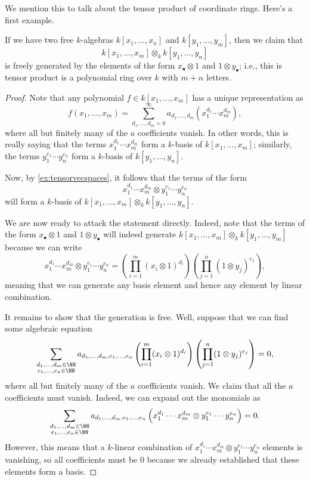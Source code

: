 We mention this to talk about the tensor product of coordinate rings. Here's a first example.
\begin{exe} \label{exe:basictensorcoordinate}
	If we have two free $k$-algebras $k[x_1,\ldots,x_n]$ and $k[y_1,\ldots,y_m]$, then we claim that
	\[k[x_1,\ldots,x_m]\otimes_kk[y_1,\ldots,y_n]\]
	is freely generated by the elements of the form $x_\bullet\otimes1$ and $1\otimes y_\bullet$; i.e., this is tensor product is a polynomial ring over $k$ with $m+n$ letters.
\end{exe}
\begin{proof}
	Note that any polynomial $f\in k[x_1,\ldots,x_m]$ has a unique representation as
	\[f(x_1,\ldots,x_m)=\sum_{d_1,\ldots,d_m=0}^\infty a_{d_1,\ldots,d_m}\left(x_1^{d_1}\cdots x_m^{d_m}\right),\]
	where all but finitely many of the $a$ coefficients vanish. In other words, this is really saying that the terms $x_1^{d_1}\cdots x_m^{d_m}$ form a $k$-basis of $k[x_1,\ldots,x_m]$; similarly, the terms $y_1^{e_1}\cdots y_n^{e_n}$ form a $k$-basis of $k[y_1,\ldots,y_n]$.

	Now, by \autoref{ex:tensorvecspaces}, it follows that the terms of the form
	\[x_1^{d_1}\cdots x_m^{d_m}\otimes y_1^{e_1}\cdots y_n^{e_n}\]
	will form a $k$-basis of $k[x_1,\ldots,x_m]\otimes_kk[y_1,\ldots,y_n]$.

	We are now ready to attack the statement directly. Indeed, note that the terms of the form $x_\bullet\otimes1$ and $1\otimes y_\bullet$ will indeed generate $k[x_1,\ldots,x_m]\otimes_kk[y_1,\ldots,y_m]$ because we can write
	\[x_1^{d_1}\cdots x_m^{d_m}\otimes y_1^{e_1}\cdots y_n^{e_n}=\left(\prod_{i=1}^m(x_i\otimes1)^{d_i}\right)\left(\prod_{j=1}^n(1\otimes y_j)^{e_j}\right),\]
	meaning that we can generate any basis element and hence any element by linear combination.

	It remains to show that the generation is free. Well, suppose that we can find some algebraic equation
	\[\sum_{\substack{d_1,\ldots,d_m\in\NN\\e_1,\ldots,e_n\in\NN}}a_{d_1,\ldots,d_m,e_1,\ldots,e_n}\left(\prod_{i=1}^m(x_i\otimes1)^{d_i}\right)\left(\prod_{j=1}^n(1\otimes y_j)^{e_j}\right)=0,\]
	where all but finitely many of the $a$ coefficients vanish. We claim that all the $a$ coefficients must vanish. Indeed, we can expand out the monomials as
	\[\sum_{\substack{d_1,\ldots,d_m\in\NN\\e_1,\ldots,e_n\in\NN}}a_{d_1,\ldots,d_m,e_1,\ldots,e_n}\left(x_1^{d_1}\cdots x_m^{d_m}\otimes y_1^{e_1}\cdots y_n^{e_n}\right)=0.\]
	However, this means that a $k$-linear combination of $x_1^{d_1}\cdots x_m^{d_m}\otimes y_1^{e_1}\cdots y_n^{e_n}$ elements is vanishing, so all coefficients must be $0$ because we already established that these elements form a basis.
\end{proof}
